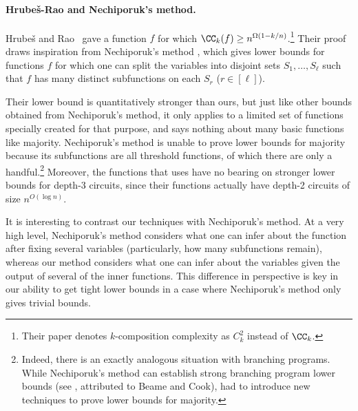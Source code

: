 \paragraph*{Hrube\v{s}-Rao and Nechiporuk's method.}
Hrubeš and Rao~\cite{HR15} gave a function $f$ for which
$\CC_k(f) \geq n^{\Omega(1 - k/n)}$.\footnote{Their paper denotes $k$-composition complexity as $C^2_k$ instead of $\CC_k$.}
Their proof draws inspiration from Nechiporuk's method \cite{Nec66},
which gives lower bounds for functions $f$ for which one
can split the variables into disjoint sets $S_1, \ldots, S_\ell$ 
such that $f$ has many distinct subfunctions on each $S_r$ ($r \in [\ell]$).

Their lower bound is quantitatively stronger than
ours,
but just like other bounds obtained from
Nechiporuk's method,
it only applies
to a limited set of functions specially created for that purpose,
and says nothing about many basic functions like majority.
Nechiporuk's method is unable to prove lower bounds for majority because its subfunctions are all threshold functions, of which there are only a handful.\footnote{Indeed, there is an exactly analogous situation with branching programs. While Nechiporuk's method can establish strong branching program lower bounds (see \cite[Theorem~2]{Raz91}, attributed to Beame and Cook), \cite{AM86,BPRS90} had to introduce new techniques to prove lower bounds for majority.} Moreover, the functions that \cite{HR15} uses have no bearing on stronger lower bounds for depth-3 circuits, since their functions actually have depth-2 circuits of size $n^{O(\log n)}$.




It is interesting to contrast our techniques with Nechiporuk's method. At a very high level, Nechiporuk's method considers what one can infer about the function after fixing several variables (particularly, how many subfunctions remain), whereas our method considers what one can infer about the variables given the output of several of the inner functions. This difference in perspective is key in our ability to get tight lower bounds in a case where Nechiporuk's method only gives trivial bounds.













